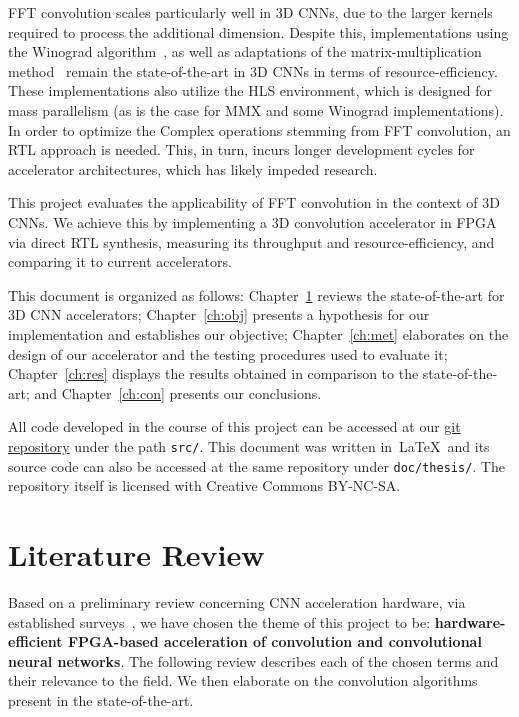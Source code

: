 FFT convolution scales particularly well in 3D CNNs, due to the larger kernels required to process the additional dimension. Despite this, implementations using the Winograd algorithm~\cite{shen2018towards}, as well as adaptations of the matrix-multiplication method~\cite{fan2021high,liu2021accelerating} remain the state-of-the-art in 3D CNNs in terms of resource-efficiency. These implementations also utilize the HLS environment, which is designed for mass parallelism (as is the case for MMX and some Winograd implementations). In order to optimize the Complex operations stemming from FFT convolution, an RTL approach is needed. This, in turn, incurs longer development cycles for accelerator architectures, which has likely impeded research.

This project evaluates the applicability of FFT convolution in the context of 3D CNNs. We achieve this by implementing a 3D convolution accelerator in FPGA via direct RTL synthesis, measuring its throughput and resource-efficiency, and comparing it to current accelerators.

This document is organized as follows: Chapter~\ref{ch:rev} reviews the state-of-the-art for 3D CNN accelerators; Chapter~\ref{ch:obj} presents a hypothesis for our implementation and establishes our objective; Chapter~\ref{ch:met} elaborates on the design of our accelerator and the testing procedures used to evaluate it; Chapter~\ref{ch:res} displays the results obtained in comparison to the state-of-the-art; and Chapter~\ref{ch:con} presents our conclusions.

All code developed in the course of this project can be accessed at our \href{https://github.com/RicardoLera/Hecate}{git repository} under the path \texttt{src/}. This document was written in~\LaTeX~and its source code can also be accessed at the same repository under \texttt{doc/thesis/}. The repository itself is licensed with Creative Commons BY-NC-SA.

\chapter{Literature Review}\label{ch:rev}

Based on a preliminary review concerning CNN acceleration hardware, via established surveys~\cite{mittal2020survey,mittal2021survey}, we have chosen the theme of this project to be: \textbf{hardware-efficient FPGA-based acceleration of convolution and convolutional neural networks}. The following review describes each of the chosen terms and their relevance to the field. We then elaborate on the convolution algorithms present in the state-of-the-art.

